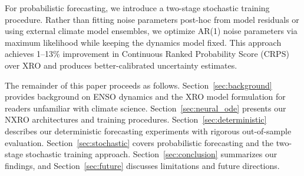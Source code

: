 For probabilistic forecasting, we introduce a two-stage stochastic training procedure. Rather than fitting noise parameters post-hoc from model residuals or using external climate model ensembles, we optimize AR(1) noise parameters via maximum likelihood while keeping the dynamics model fixed. This approach achieves 1--13\% improvement in Continuous Ranked Probability Score (CRPS)~\cite{hersbach2000,gneiting2007} over XRO and produces better-calibrated uncertainty estimates.

The remainder of this paper proceeds as follows. Section~\ref{sec:background} provides background on ENSO dynamics and the XRO model formulation for readers unfamiliar with climate science. Section~\ref{sec:neural_ode} presents our NXRO architectures and training procedures. Section~\ref{sec:deterministic} describes our deterministic forecasting experiments with rigorous out-of-sample evaluation. Section~\ref{sec:stochastic} covers probabilistic forecasting and the two-stage stochastic training approach. Section~\ref{sec:conclusion} summarizes our findings, and Section~\ref{sec:future} discusses limitations and future directions.
